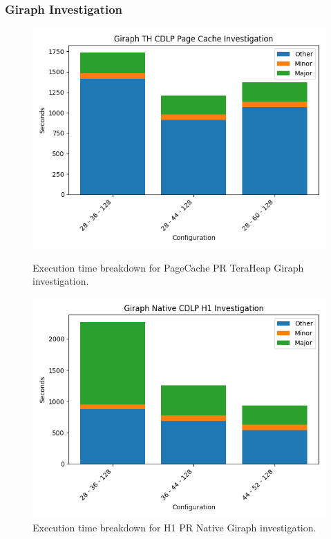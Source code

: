 \subsubsection{Giraph Investigation}
\begin{figure}[thbp]
    \includegraphics[width=\linewidth]{./fig/g_pr_pc_th.png}
    \caption{Execution time breakdown for PageCache PR TeraHeap
    Giraph investigation.}
    \label{fig:g_pr_pc_th}

    \includegraphics[width=\linewidth]{./fig/g_pr_h1_native.png}
    \caption{Execution time breakdown for H1 PR Native
    Giraph investigation.}
    \label{fig:g_pr_h1_native}
\end{figure}

